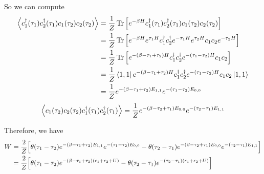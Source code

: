 \documentclass{article}
\begin{document}
So we can compute 
\begin{equation}
    \begin{split}
        \expval{c_1^\dagger(\tau_1) c_2^\dagger(\tau_1)c_1(\tau_2)c_2(\tau_2)}&=\frac{1}{Z}\Tr\qty[e^{-\beta H}c_1^\dagger(\tau_1) c_2^\dagger(\tau_1)c_1(\tau_2)c_2(\tau_2)]\\
                                                                              &=\frac{1}{Z}\Tr\qty[e^{-\beta H}e^{\tau_1 H}c_1^\dagger c_2^\dagger e^{-\tau_1 H}e^{\tau_2 H}c_1 c_2 e^{-\tau_2 H}]\\
                                                                              &=\frac{1}{Z}\Tr\qty[e^{-(\beta-\tau_1+\tau_2) H}c_1^\dagger c_2^\dagger e^{-(\tau_1-\tau_2) H}c_1 c_2]\\
                                                                              &=\frac{1}{Z}\bra{1,1}e^{-(\beta-\tau_1+\tau_2) H}c_1^\dagger c_2^\dagger e^{-(\tau_1-\tau_2) H}c_1 c_2\ket{1,1}\\
                                                                              &=\frac{1}{Z}e^{-(\beta-\tau_1+\tau_2) E_{1,1}}e^{-(\tau_1-\tau_2) E_{0,0}}\\
    \end{split}
\end{equation}
\begin{equation}
    \expval{c_1(\tau_2)c_2(\tau_2)c_1^\dagger(\tau_1) c_2^\dagger(\tau_1)}=\frac{1}{Z}e^{-(\beta-\tau_2+\tau_1) E_{0,0}}e^{-(\tau_2-\tau_1) E_{1,1}}
\end{equation}

Therefore, we have 
\begin{equation}
    \begin{split}
        W&=\frac{2}{Z}\qty[\theta(\tau_1-\tau_2)e^{-(\beta-\tau_1+\tau_2) E_{1,1}}e^{-(\tau_1-\tau_2) E_{0,0}}-\theta(\tau_2-\tau_1)e^{-(\beta-\tau_2+\tau_1) E_{0,0}}e^{-(\tau_2-\tau_1) E_{1,1}}]\\
            &=\frac{2}{Z}\qty[\theta(\tau_1-\tau_2)e^{-(\beta-\tau_1+\tau_2) (\epsilon_1+\epsilon_2+U)}-\theta(\tau_2-\tau_1)e^{-(\tau_2-\tau_1) (\epsilon_1+\epsilon_2+U)}]
    \end{split}
\end{equation}
\end{document}
